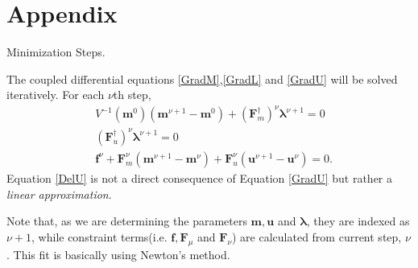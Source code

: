 \documentclass[
	xcolor=dvipsnames,
	aspectratio=169,	
	10pt, 
	]{beamer}
\begin{document}
\section{Appendix}
\begin{frame}{Minimization Steps.}
	\large
	\begin{block}{}
		The coupled differential equations \eqref{GradM},\eqref{GradL} and \eqref{GradU} will be solved iteratively. For each $\nu$th step,
		\begin{align}
			&V^{-1}(\mathbf m^0)(\mathbf{m}^{\nu+1}-\mathbf{m}^0)+(\mathbf{F}_m^\dagger)^\nu\mathbf\lambda^{\nu+1}=0\label{DelM}\\
			&(\mathbf{F}_u^\dagger)^\nu\mathbf\lambda^{\nu+1}=0\label{DelL}\\
			&\mathbf f^\nu + \mathbf F^\nu_m (\mathbf m^{\nu+1}-\mathbf m^\nu) + \mathbf F^\nu_u(\mathbf u^{\nu+1}-\mathbf u^\nu)=0\label{DelU}.
		\end{align}
		Equation \eqref{DelU} is not a direct consequence of Equation \eqref{GradU} but rather a \textit{linear approximation}.  
		
		Note that, as we are determining the parameters $\mathbf m, \mathbf u$ and $\mathbf \lambda$, they are indexed as $\nu+1$, while constraint terms(i.e. $\mathbf f,\mathbf F_\mu$ and $\mathbf F_\nu$) are calculated from current step, $\nu$. This fit is basically using Newton's method.
	\end{block}
\end{frame}
\end{document}
